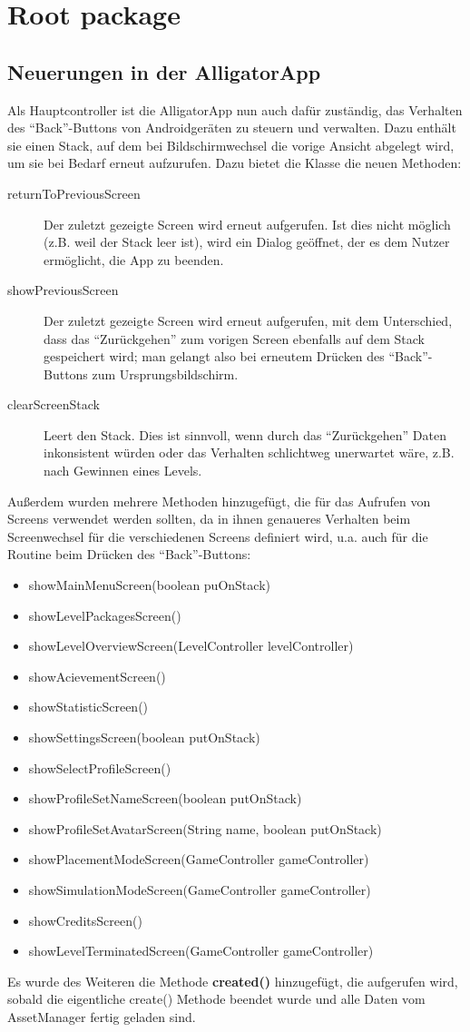 \section{Root package}

\subsection{Neuerungen in der AlligatorApp}

Als Hauptcontroller ist die AlligatorApp nun auch dafür zuständig, das Verhalten des "`Back"'-Buttons von Androidgeräten zu steuern und verwalten. Dazu enthält sie einen Stack, auf dem bei Bildschirmwechsel die vorige Ansicht abgelegt wird, um sie bei Bedarf erneut aufzurufen. Dazu bietet die Klasse die neuen Methoden:
\begin{description}
	\item[returnToPreviousScreen] Der zuletzt gezeigte Screen wird erneut aufgerufen. Ist dies nicht möglich (z.B. weil der Stack leer ist), wird ein Dialog geöffnet, der es dem Nutzer ermöglicht, die App zu beenden.
	\item[showPreviousScreen] Der zuletzt gezeigte Screen wird erneut aufgerufen, mit dem Unterschied, dass das "`Zurückgehen"' zum vorigen Screen ebenfalls auf dem Stack gespeichert wird; man gelangt also bei erneutem Drücken des "`Back"'-Buttons zum Ursprungsbildschirm.
	\item[clearScreenStack] Leert den Stack. Dies ist sinnvoll, wenn durch das "`Zurückgehen"' Daten inkonsistent würden oder das Verhalten schlichtweg unerwartet wäre, z.B. nach Gewinnen eines Levels.
\end{description}

Außerdem wurden mehrere Methoden hinzugefügt, die für das Aufrufen von Screens verwendet werden sollten, da in ihnen genaueres Verhalten beim Screenwechsel für die verschiedenen Screens definiert wird, u.a. auch für die Routine beim Drücken des "`Back"'-Buttons:
\begin{itemize}
	\item showMainMenuScreen(boolean puOnStack)
	\item showLevelPackagesScreen()
	\item showLevelOverviewScreen(LevelController levelController)
	\item showAcievementScreen()
	\item showStatisticScreen()
	\item showSettingsScreen(boolean putOnStack)
	\item showSelectProfileScreen()
	\item showProfileSetNameScreen(boolean putOnStack)
	\item showProfileSetAvatarScreen(String name, boolean putOnStack)
	\item showPlacementModeScreen(GameController gameController)
	\item showSimulationModeScreen(GameController gameController)
	\item showCreditsScreen()
	\item showLevelTerminatedScreen(GameController gameController)
\end{itemize}

Es wurde des Weiteren die Methode \textbf{created()} hinzugefügt, die aufgerufen wird, sobald die eigentliche create() Methode beendet wurde und alle Daten vom AssetManager fertig geladen sind.
 

